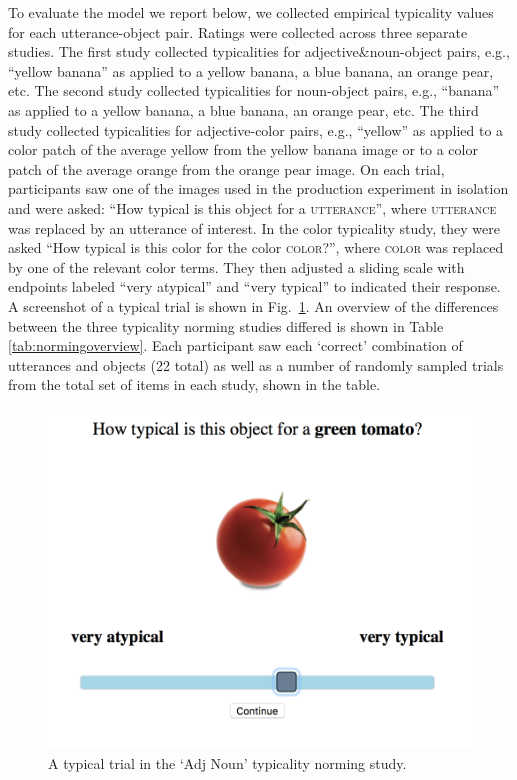 \documentclass[10pt,letterpaper]{article}
\newcommand{\tableref}[1]{Table \ref{#1}}
\newcommand{\figref}[1]{Fig.~\ref{#1}}
\begin{document}
To evaluate the model we report below, we collected empirical typicality values for each utterance-object pair. Ratings were collected across three separate studies. The first study collected typicalities for adjective\&noun-object pairs, e.g., ``yellow banana'' as applied to a yellow banana, a blue banana, an orange pear, etc. The second study collected typicalities for noun-object pairs, e.g., ``banana'' as applied to a yellow banana, a blue banana, an orange pear, etc. The third study collected typicalities for adjective-color pairs, e.g., ``yellow'' as applied to a color patch of the average yellow from the yellow banana image or to a color patch of the average orange from the orange pear image.  On each trial, participants saw one of the images used in the production experiment in isolation and were asked: ``How typical is this object for a \textsc{utterance}'', where \textsc{utterance} was replaced by an utterance of interest. In the color typicality study, they were asked ``How typical is this color for the color \textsc{color}?'', where \textsc{color} was replaced by one of the relevant color terms.  They then adjusted a sliding scale with endpoints labeled ``very atypical'' and ``very typical'' to indicated their response. A screenshot of a typical trial is shown in \figref{fig:typicalitynorming}. An overview of the differences between the three typicality norming studies differed is shown in \tableref{tab:normingoverview}. Each participant saw each `correct' combination of utterances and objects (22 total) as well as a number of randomly sampled trials from the total set of items in each study, shown in the table.

\begin{figure}[bt!]
	\centering
	\includegraphics[width=.5\textwidth]{graphs/typ_norm_full_2}
	\caption{A typical trial in the `Adj Noun' typicality norming study.
	}
	\label{fig:typicalitynorming}
\end{figure}
\end{document}
